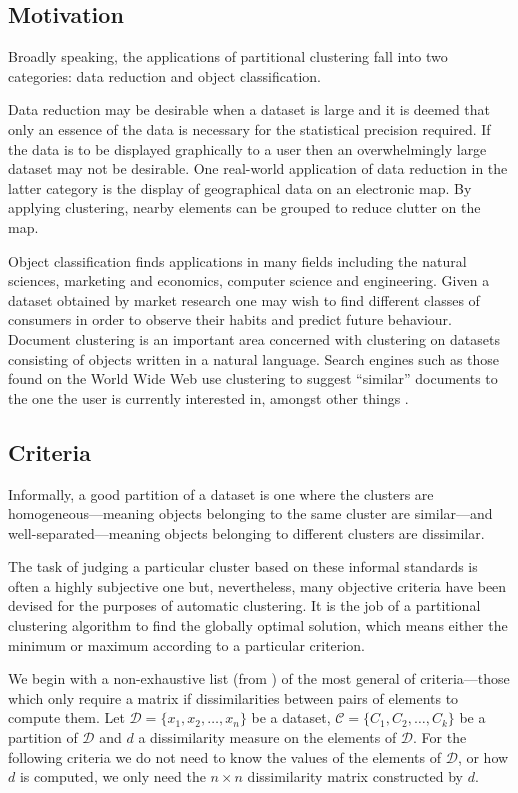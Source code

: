 \documentclass[a4paper]{report}
\newcommand{\dset}{\mathcal{D}}
\newcommand{\clus}{\mathcal{C}}
\begin{document}
\subsection{Motivation}
\label{sec:part-clus-motivation}

Broadly speaking, the applications of partitional clustering fall into two
categories: data reduction and object classification.

Data reduction may be desirable when a dataset is large and it is deemed that
only an essence of the data is necessary for the statistical precision
required.  If the data is to be displayed graphically to a user then an
overwhelmingly large dataset may not be desirable.  One real-world application
of data reduction in the latter category is the display of geographical data
on an electronic map.  By applying clustering, nearby elements can be grouped
to reduce clutter on the map.

Object classification finds applications in many fields including the natural
sciences, marketing and economics, computer science and engineering.  Given a
dataset obtained by market research one may wish to find different classes of
consumers in order to observe their habits and predict future behaviour.
Document clustering is an important area concerned with clustering on datasets
consisting of objects written in a natural language.  Search engines such as
those found on the World Wide Web use clustering to suggest ``similar''
documents to the one the user is currently interested in, amongst other things
\citep{steinbach2000comparison}.

\subsection{Criteria}
\label{sec:criteria}

Informally, a good partition of a dataset is one where the clusters are
homogeneous---meaning objects belonging to the same cluster are similar---and
well-separated---meaning objects belonging to different clusters are
dissimilar.

The task of judging a particular cluster based on these informal standards is
often a highly subjective one but, nevertheless, many objective criteria have
been devised for the purposes of automatic clustering.  It is the job of a
partitional clustering algorithm to find the globally optimal solution, which
means either the minimum or maximum according to a particular criterion.

We begin with a non-exhaustive list (from \citep{hansen1997mathprog}) of the
most general of criteria---those which only require a matrix if
dissimilarities between pairs of elements to compute them.  Let $\dset =
\{x_1,x_2,\dotsc,x_n\}$ be a dataset, $\clus = \{C_1,C_2,\dotsc,C_k\}$ be a
partition of $\dset$ and $d$ a dissimilarity measure on the elements of
$\dset$.  For the following criteria we do not need to know the values of the
elements of $\dset$, or how $d$ is computed, we only need the $n \times n$
dissimilarity matrix constructed by $d$.
\end{document}
